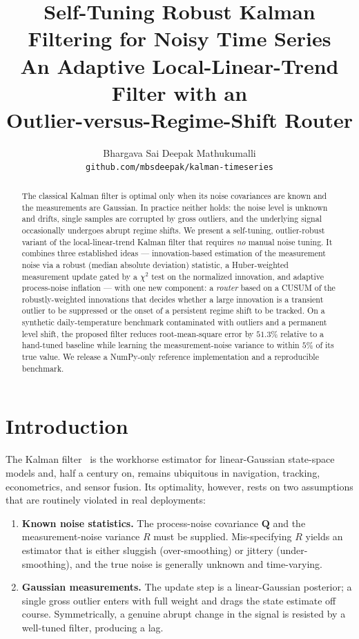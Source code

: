 \documentclass[10pt,twocolumn]{article}
\title{\vspace{-2.5em}\textbf{Self-Tuning Robust Kalman Filtering for Noisy Time
Series}\\[0.2em]
\large An Adaptive Local-Linear-Trend Filter with an\\
Outlier-versus-Regime-Shift Router}
\author{Bhargava Sai Deepak Mathukumalli\\
\small \texttt{github.com/mbsdeepak/kalman-timeseries}}
\date{}
\newcommand{\mQ}{\mathbf{Q}}
\newcommand{\Rmeas}{R}
\begin{document}
\maketitle

\begin{abstract}
\noindent
The classical Kalman filter is optimal only when its noise covariances are known
and the measurements are Gaussian. In practice neither holds: the noise level is
unknown and drifts, single samples are corrupted by gross outliers, and the
underlying signal occasionally undergoes abrupt regime shifts. We present a
self-tuning, outlier-robust variant of the local-linear-trend Kalman filter that
requires \emph{no} manual noise tuning. It combines three established ideas ---
innovation-based estimation of the measurement noise via a robust (median
absolute deviation) statistic, a Huber-weighted measurement update gated by a
$\chi^2$ test on the normalized innovation, and adaptive process-noise inflation
--- with one new component: a \emph{router} based on a CUSUM of the
robustly-weighted innovations that decides whether a large innovation is a
transient outlier to be suppressed or the onset of a persistent regime shift to
be tracked. On a synthetic daily-temperature benchmark contaminated with
outliers and a permanent level shift, the proposed filter reduces root-mean-square
error by $51.3\%$ relative to a hand-tuned baseline while learning the
measurement-noise variance to within $5\%$ of its true value. We release a
NumPy-only reference implementation and a reproducible benchmark.
\end{abstract}

\section{Introduction}
The Kalman filter~\cite{kalman1960} is the workhorse estimator for
linear-Gaussian state-space models and, half a century on, remains ubiquitous in
navigation, tracking, econometrics, and sensor fusion. Its optimality, however,
rests on two assumptions that are routinely violated in real deployments:

\begin{enumerate}
\item \textbf{Known noise statistics.} The process-noise covariance $\mQ$ and the
measurement-noise variance $\Rmeas$ must be supplied. Mis-specifying $\Rmeas$
yields an estimator that is either sluggish (over-smoothing) or jittery
(under-smoothing), and the true noise is generally unknown and time-varying.
\item \textbf{Gaussian measurements.} The update step is a linear-Gaussian
posterior; a single gross outlier enters with full weight and drags the state
estimate off course. Symmetrically, a genuine abrupt change in the signal is
resisted by a well-tuned filter, producing a lag.
\end{enumerate}
\end{document}
